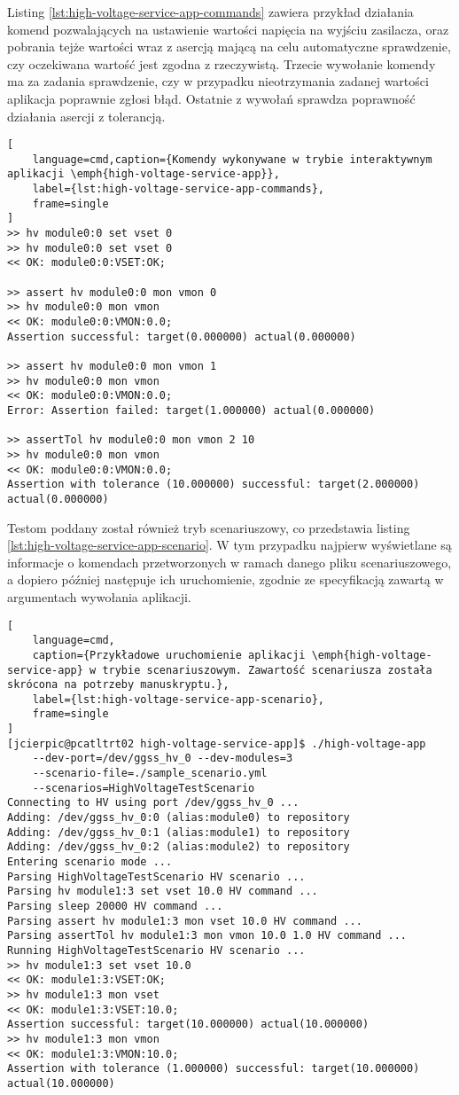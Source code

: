 Listing \ref{lst:high-voltage-service-app-commands} zawiera przykład działania komend pozwalających na ustawienie wartości napięcia na wyjściu zasilacza, oraz pobrania tejże wartości wraz z asercją mającą na celu automatyczne sprawdzenie, czy oczekiwana wartość jest zgodna z rzeczywistą. Trzecie wywołanie komendy ma za zadania sprawdzenie, czy w przypadku nieotrzymania zadanej wartości aplikacja poprawnie zgłosi błąd. Ostatnie z wywołań sprawdza poprawność działania asercji z tolerancją.

\begin{lstlisting}[
    language=cmd,caption={Komendy wykonywane w trybie interaktywnym aplikacji \emph{high-voltage-service-app}},
    label={lst:high-voltage-service-app-commands},
    frame=single
]
>> hv module0:0 set vset 0
>> hv module0:0 set vset 0
<< OK: module0:0:VSET:OK;

>> assert hv module0:0 mon vmon 0
>> hv module0:0 mon vmon
<< OK: module0:0:VMON:0.0;
Assertion successful: target(0.000000) actual(0.000000)

>> assert hv module0:0 mon vmon 1
>> hv module0:0 mon vmon
<< OK: module0:0:VMON:0.0;
Error: Assertion failed: target(1.000000) actual(0.000000)

>> assertTol hv module0:0 mon vmon 2 10
>> hv module0:0 mon vmon
<< OK: module0:0:VMON:0.0;
Assertion with tolerance (10.000000) successful: target(2.000000) actual(0.000000)
\end{lstlisting}

Testom poddany został również tryb scenariuszowy, co przedstawia listing \ref{lst:high-voltage-service-app-scenario}. W tym przypadku najpierw wyświetlane są informacje o komendach przetworzonych w ramach danego pliku scenariuszowego, a dopiero później następuje ich uruchomienie, zgodnie ze specyfikacją zawartą w argumentach wywołania aplikacji.

\begin{lstlisting}[
    language=cmd,
    caption={Przykładowe uruchomienie aplikacji \emph{high-voltage-service-app} w trybie scenariuszowym. Zawartość scenariusza została skrócona na potrzeby manuskryptu.},
    label={lst:high-voltage-service-app-scenario},
    frame=single
]
[jcierpic@pcatltrt02 high-voltage-service-app]$ ./high-voltage-app 
    --dev-port=/dev/ggss_hv_0 --dev-modules=3 
    --scenario-file=./sample_scenario.yml 
    --scenarios=HighVoltageTestScenario
Connecting to HV using port /dev/ggss_hv_0 ...
Adding: /dev/ggss_hv_0:0 (alias:module0) to repository
Adding: /dev/ggss_hv_0:1 (alias:module1) to repository
Adding: /dev/ggss_hv_0:2 (alias:module2) to repository
Entering scenario mode ...
Parsing HighVoltageTestScenario HV scenario ...
Parsing hv module1:3 set vset 10.0 HV command ...
Parsing sleep 20000 HV command ...
Parsing assert hv module1:3 mon vset 10.0 HV command ...
Parsing assertTol hv module1:3 mon vmon 10.0 1.0 HV command ...
Running HighVoltageTestScenario HV scenario ...
>> hv module1:3 set vset 10.0
<< OK: module1:3:VSET:OK;
>> hv module1:3 mon vset
<< OK: module1:3:VSET:10.0;
Assertion successful: target(10.000000) actual(10.000000)
>> hv module1:3 mon vmon
<< OK: module1:3:VMON:10.0;
Assertion with tolerance (1.000000) successful: target(10.000000) actual(10.000000)
\end{lstlisting}

